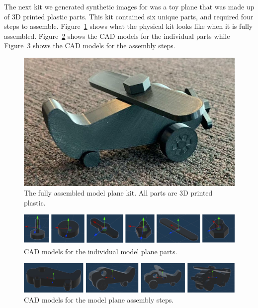 The next kit we generated synthetic images for was a toy plane that was made up
of 3D printed plastic parts.
This kit contained six unique parts, and required four steps to assemble.
Figure~\ref{fig:assembled_plane} shows what the physical kit looks like when it
is fully assembled.
Figure~\ref{fig:plane_parts} shows the CAD models for the individual parts while
Figure~\ref{fig:plane_steps} shows the CAD models for the assembly steps.

\begin{figure}
  \includegraphics[width=\columnwidth]{figures/synthetic/toy_plane.jpg}
  \caption{
    The fully assembled model plane kit. All parts are 3D printed plastic.
  }\label{fig:assembled_plane}
\end{figure}

\begin{figure}
  \includegraphics[width=\columnwidth]{figures/synthetic/plane_parts.pdf}
  \caption{
    CAD models for the individual model plane parts.
  }\label{fig:plane_parts}
\end{figure}

\begin{figure}
  \includegraphics[width=\columnwidth]{figures/synthetic/plane_steps.pdf}
  \caption{
    CAD models for the model plane assembly steps.
  }\label{fig:plane_steps}
\end{figure}

